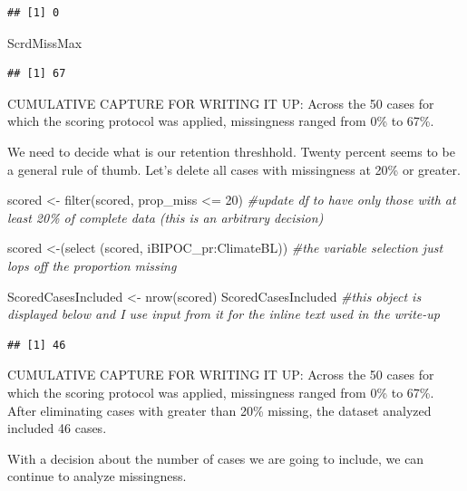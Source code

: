 \documentclass[
]{book}
\newenvironment{Shaded}{\begin{snugshade}}{\end{snugshade}}
\newcommand{\CommentTok}[1]{\textcolor[rgb]{0.56,0.35,0.01}{\textit{#1}}}
\newcommand{\DecValTok}[1]{\textcolor[rgb]{0.00,0.00,0.81}{#1}}
\newcommand{\FunctionTok}[1]{\textcolor[rgb]{0.00,0.00,0.00}{#1}}
\newcommand{\NormalTok}[1]{#1}
\newcommand{\OtherTok}[1]{\textcolor[rgb]{0.56,0.35,0.01}{#1}}
\newcommand{\SpecialCharTok}[1]{\textcolor[rgb]{0.00,0.00,0.00}{#1}}
\begin{document}
\begin{verbatim}
## [1] 0
\end{verbatim}

\begin{Shaded}
\begin{Highlighting}[]
\NormalTok{ScrdMissMax}
\end{Highlighting}
\end{Shaded}

\begin{verbatim}
## [1] 67
\end{verbatim}

CUMULATIVE CAPTURE FOR WRITING IT UP: Across the 50 cases for which the scoring protocol was applied, missingness ranged from 0\% to 67\%.

We need to decide what is our retention threshhold. Twenty percent seems to be a general rule of thumb. Let's delete all cases with missingness at 20\% or greater.

\begin{Shaded}
\begin{Highlighting}[]
\NormalTok{scored }\OtherTok{\textless{}{-}} \FunctionTok{filter}\NormalTok{(scored, prop\_miss }\SpecialCharTok{\textless{}=} \DecValTok{20}\NormalTok{)  }\CommentTok{\#update df to have only those with at least 20\% of complete data (this is an arbitrary decision)}

\NormalTok{scored }\OtherTok{\textless{}{-}}\NormalTok{(}\FunctionTok{select}\NormalTok{ (scored, iBIPOC\_pr}\SpecialCharTok{:}\NormalTok{ClimateBL)) }\CommentTok{\#the variable selection just lops off the proportion missing}

\NormalTok{ScoredCasesIncluded }\OtherTok{\textless{}{-}} \FunctionTok{nrow}\NormalTok{(scored)}
\NormalTok{ScoredCasesIncluded }\CommentTok{\#this object is displayed below and I use input from  it for the inline text used in the write{-}up}
\end{Highlighting}
\end{Shaded}

\begin{verbatim}
## [1] 46
\end{verbatim}

CUMULATIVE CAPTURE FOR WRITING IT UP: Across the 50 cases for which the scoring protocol was applied, missingness ranged from 0\% to 67\%. After eliminating cases with greater than 20\% missing, the dataset analyzed included 46 cases.

With a decision about the number of cases we are going to include, we can continue to analyze missingness.
\end{document}
